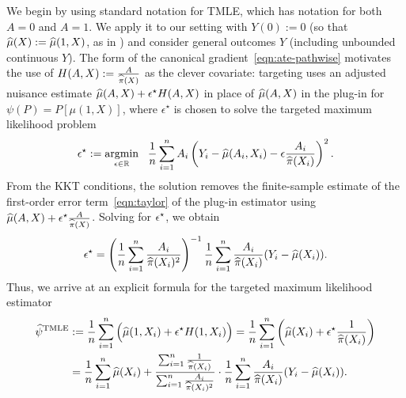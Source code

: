 We begin by using standard notation for TMLE, which has notation for both $A=0$ and $A=1$. We apply it to our setting with $Y(0):=0$ (so that $\widehat{\mu}(X):= \widehat{\mu}(1,X)$, as in ) and consider general outcomes $Y$
(including unbounded continuous $Y$). The form of the canonical gradient~\eqref{eqn:ate-pathwise} motivates the use of $H(A,X):=\frac{A}{ \widehat{\pi}(X)}$ as the clever covariate: %
targeting uses an adjusted nuisance estimate
$\widehat{\mu}(A,X)+\epsilon^\star H(A,X)$ %
in place of $\widehat{\mu}(A,X)$
in the plug-in for $\psi(P)=P[\mu(1,X)]$, 
where $\epsilon^\star$ is chosen to solve the targeted maximum likelihood problem
\vspace{-0.3em}
\begin{equation}
    \label{eqn:targeting}
    \epsilon^\star:=\mathop{\rm argmin}_{\epsilon \in \mathbb{R}} 
    ~~\frac{1}{n}\sum_{i=1}^n  A_i \left( 
    Y_i - \widehat{\mu}(A_i,X_i) - \epsilon \frac{A_i}{\widehat{\pi}(X_i)}\right)^2.
\end{equation}
From the KKT conditions, %
the solution
removes the 
finite-sample estimate of the first-order error term~\eqref{eqn:taylor} of the plug-in estimator using $\widehat{\mu}(A,X) + \epsilon^\star \frac{A}{ \widehat{\pi}(X)}$. Solving for $\epsilon^\star$, we obtain
\vspace{-0.3em}
\begin{equation}
    \label{eqn:tmle-eps}
    \epsilon^\star = 
    \left(
    \frac{1}{n}\sum_{i=1}^n \frac{A_i}{\widehat{\pi}(X_i)^2}
    \right)^{-1}
    \frac{1}{n} \sum_{i=1}^n 
    \frac{A_i}{\widehat{\pi}(X_i)} (Y_i - \widehat{\mu}(X_i)).
\end{equation}
Thus, we arrive at an explicit formula for the targeted maximum likelihood estimator
\vspace{-0.3em}
\begin{align}
    \what{\psi}^{\rm TMLE}
    & \defeq \frac{1}{n} \sum_{i=1}^n \Big(\what\mu(1,X_i)+\epsilon^\star H(1,X_i)\Big) %
    =
    \frac{1}{n} \sum_{i=1}^n \left(\what{\mu}(X_i)
    + \epsilon^\star \frac{1}{\what{\pi}(X_i)}\right) \nonumber \\
    & = \frac{1}{n} \sum_{i=1}^n \what{\mu}(X_i)
    + \frac{\sum_{i=1}^n \frac{1}{\what{\pi}(X_i)}}{\sum_{i=1}^n \frac{A_i}{\what{\pi}(X_i)^2}}
    \cdot \frac{1}{n} \sum_{i=1}^n 
    \frac{A_i}{\what{\pi}(X_i)} (Y_i - \what{\mu}(X_i)).
        \label{eqn:tmle}   
\end{align}



















